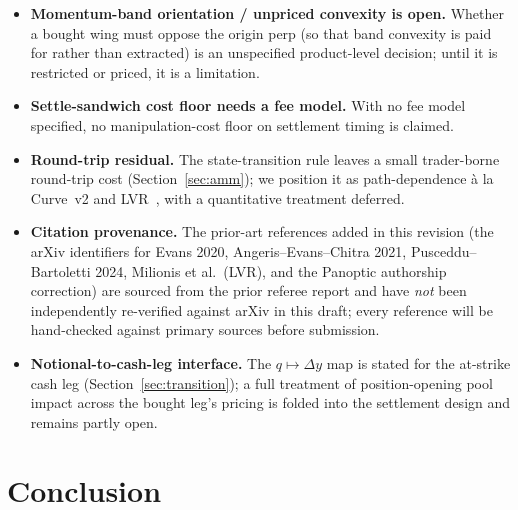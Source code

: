 \documentclass[runningheads]{llncs}
\begin{document}
\begin{itemize}[leftmargin=2em]
        counterparty floor, and the carved-equity boundary at liquidation are not
        all closed here. We carry these as open rather than imply a balanced
        ledger.
  \item \textbf{Momentum-band orientation / unpriced convexity is open.} Whether a
        bought wing must oppose the origin perp (so that band convexity is paid
        for rather than extracted) is an unspecified product-level decision; until
        it is restricted or priced, it is a limitation.
  \item \textbf{Settle-sandwich cost floor needs a fee model.} With no fee model
        specified, no manipulation-cost floor on settlement timing is claimed.
  \item \textbf{Round-trip residual.} The state-transition rule leaves a small
        trader-borne round-trip cost (Section~\ref{sec:amm}); we position it as
        path-dependence \`a la Curve~v2 and LVR~\cite{lvr}, with a quantitative
        treatment deferred.
  \item \textbf{Citation provenance.} The prior-art references added in this
        revision (the arXiv identifiers for Evans 2020, Angeris--Evans--Chitra
        2021, Pusceddu--Bartoletti 2024, Milionis et al.\ (LVR), and the Panoptic
        authorship correction) are sourced from the prior referee report and have
        \emph{not} been independently re-verified against arXiv in this draft;
        every reference will be hand-checked against primary sources before
        submission.
  \item \textbf{Notional-to-cash-leg interface.} The $q\mapsto\Delta y$ map is
        stated for the at-strike cash leg (Section~\ref{sec:transition}); a full
        treatment of position-opening pool impact across the bought leg's pricing
        is folded into the settlement design and remains partly open.
\end{itemize}

\section{Conclusion}\label{sec:conclusion}
\end{document}
